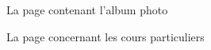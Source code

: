 \documentclass{article}[12pt]
\begin{document}
     \begin{figure}[H]
     	\centering
     	\caption{La page contenant l'album photo}
     \end{figure}
     \begin{figure}[H]
     	\centering
     	\caption{La page concernant les cours particuliers}
     \end{figure}
\end{document}
